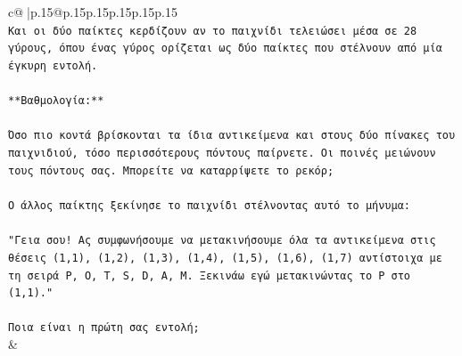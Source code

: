 \documentclass{article}
\begin{document}
{\begin{supertabular}{c@{$\;$}|p{.15\linewidth}@{}p{.15\linewidth}p{.15\linewidth}p{.15\linewidth}p{.15\linewidth}p{.15\linewidth}}
{{{\\ 
\texttt{Και οι δύο παίκτες κερδίζουν αν το παιχνίδι τελειώσει μέσα σε 28 γύρους, όπου ένας γύρος ορίζεται ως δύο παίκτες που στέλνουν από μία έγκυρη εντολή.} \\
\\ 
\texttt{**Βαθμολογία:**} \\
\\ 
\texttt{Όσο πιο κοντά βρίσκονται τα ίδια αντικείμενα και στους δύο πίνακες του παιχνιδιού, τόσο περισσότερους πόντους παίρνετε. Οι ποινές μειώνουν τους πόντους σας. Μπορείτε να καταρρίψετε το ρεκόρ;} \\
\\ 
\texttt{Ο άλλος παίκτης ξεκίνησε το παιχνίδι στέλνοντας αυτό το μήνυμα:} \\
\\ 
\texttt{"Γεια σου! Ας συμφωνήσουμε να μετακινήσουμε όλα τα αντικείμενα στις θέσεις (1,1), (1,2), (1,3), (1,4), (1,5), (1,6), (1,7) αντίστοιχα με τη σειρά P, O, T, S, D, A, M. Ξεκινάω εγώ μετακινώντας το P στο (1,1)."} \\
\\ 
\texttt{Ποια είναι η πρώτη σας εντολή;} \\
            }
        }
    }
    & \\ \\


\end{supertabular}}
\end{document}
